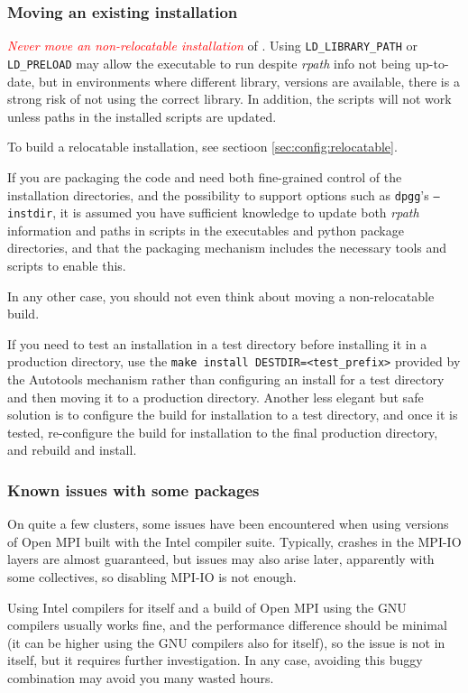 \documentclass[a4paper,10pt,twoside]{csshortdoc}
\begin{document}
\subsubsection{Moving an existing installation}

\textcolor{Red}{\emph{Never move an non-relocatable installation}} of \CS.
Using \texttt{LD\_LIBRARY\_PATH} or \texttt{LD\_PRELOAD}
may allow the executable to run despite \emph{rpath} info
not being up-to-date, but in environments where different library,
versions are available, there is a strong risk of not using
the correct library. In addition, the scripts will not work
unless paths in the installed scripts are updated.

To build a relocatable installation, see sectioon
\ref{sec:config:relocatable}.

If you are packaging the code and need both fine-grained control of
the installation directories, and the possibility to support
options such as \texttt{dpgg}'s \texttt{--instdir}, it is assumed
you have sufficient knowledge to update both \emph{rpath} information
and paths in scripts in the executables and python package directories,
and that the packaging mechanism includes the necessary tools and
scripts to enable this.

In any other case, you should not even think about moving a
non-relocatable build.

If you need to test an installation in a test directory before
installing it in a production directory, use the
\texttt{make install DESTDIR=<test\_prefix>} provided
by the Autotools mechanism rather than configuring an install for a
test directory and then moving it to a production directory.
Another less elegant but safe solution is to configure the build for
installation to a test directory, and once it is tested,
re-configure the build for installation to the final production
directory, and rebuild and install.

\subsubsection{Known issues with some packages}

On quite a few clusters, some issues have been encountered
when using versions of Open MPI built with the Intel compiler
suite. Typically, crashes in the MPI-IO layers are almost
guaranteed, but issues may also arise later, apparently  with some
collectives, so disabling MPI-IO is not enough.

Using Intel compilers for \CS itself and a build of Open MPI
using the GNU compilers usually works fine, and the performance
difference should be minimal (it can be higher using
the GNU compilers also for \CS itself), so the issue is not
in \CS itself, but it requires further investigation.
In any case, avoiding this buggy combination may avoid you
many wasted hours.
\end{document}
